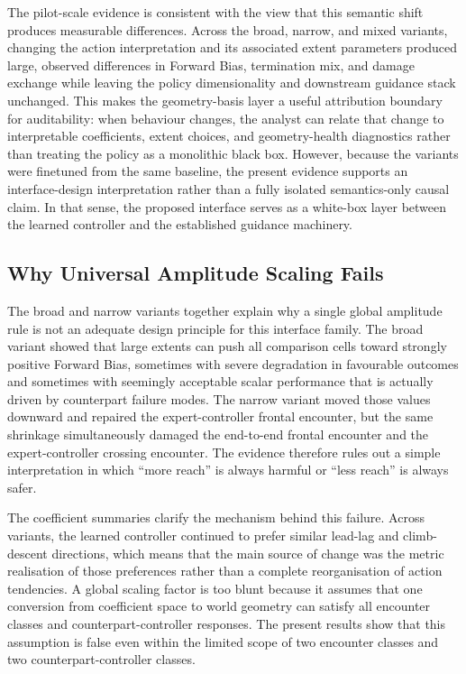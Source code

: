 \documentclass[drones,article,submit,pdftex,moreauthors]{Definitions/mdpi}
\begin{document}
The pilot-scale evidence is consistent with the view that this semantic shift produces measurable differences. Across the broad, narrow, and mixed variants, changing the action interpretation and its associated extent parameters produced large, observed differences in Forward Bias, termination mix, and damage exchange while leaving the policy dimensionality and downstream guidance stack unchanged. This makes the geometry-basis layer a useful attribution boundary for auditability: when behaviour changes, the analyst can relate that change to interpretable coefficients, extent choices, and geometry-health diagnostics rather than treating the policy as a monolithic black box. However, because the variants were finetuned from the same baseline, the present evidence supports an interface-design interpretation rather than a fully isolated semantics-only causal claim. In that sense, the proposed interface serves as a white-box layer between the learned controller and the established guidance machinery.

\subsection{Why Universal Amplitude Scaling Fails}

The broad and narrow variants together explain why a single global amplitude rule is not an adequate design principle for this interface family. The broad variant showed that large extents can push all comparison cells toward strongly positive Forward Bias, sometimes with severe degradation in favourable outcomes and sometimes with seemingly acceptable scalar performance that is actually driven by counterpart failure modes. The narrow variant moved those values downward and repaired the expert-controller frontal encounter, but the same shrinkage simultaneously damaged the end-to-end frontal encounter and the expert-controller crossing encounter. The evidence therefore rules out a simple interpretation in which ``more reach'' is always harmful or ``less reach'' is always safer.

The coefficient summaries clarify the mechanism behind this failure. Across variants, the learned controller continued to prefer similar lead-lag and climb-descent directions, which means that the main source of change was the metric realisation of those preferences rather than a complete reorganisation of action tendencies. A global scaling factor is too blunt because it assumes that one conversion from coefficient space to world geometry can satisfy all encounter classes and counterpart-controller responses. The present results show that this assumption is false even within the limited scope of two encounter classes and two counterpart-controller classes.
\end{document}
